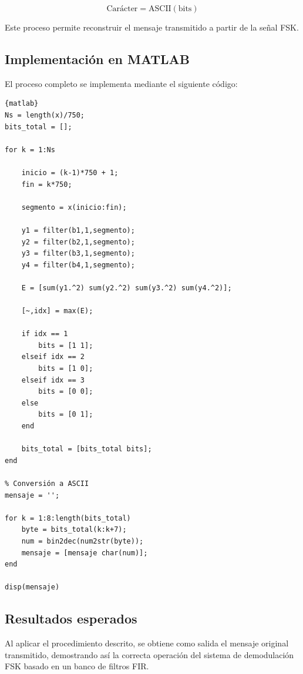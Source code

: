 \documentclass[9pt,a4paper,oneside]{rho-class/rho}
\begin{document}
\begin{equation}
\text{Carácter} = \text{ASCII}(\text{bits})
\end{equation}

Este proceso permite reconstruir el mensaje transmitido a partir de la
señal FSK.

\subsection{Implementación en MATLAB}

El proceso completo se implementa mediante el siguiente código:

\begin{verbatim}{matlab}
Ns = length(x)/750;
bits_total = [];

for k = 1:Ns
    
    inicio = (k-1)*750 + 1;
    fin = k*750;

    segmento = x(inicio:fin);

    y1 = filter(b1,1,segmento);
    y2 = filter(b2,1,segmento);
    y3 = filter(b3,1,segmento);
    y4 = filter(b4,1,segmento);

    E = [sum(y1.^2) sum(y2.^2) sum(y3.^2) sum(y4.^2)];

    [~,idx] = max(E);

    if idx == 1
        bits = [1 1];
    elseif idx == 2
        bits = [1 0];
    elseif idx == 3
        bits = [0 0];
    else
        bits = [0 1];
    end

    bits_total = [bits_total bits];
end

% Conversión a ASCII
mensaje = '';

for k = 1:8:length(bits_total)
    byte = bits_total(k:k+7);
    num = bin2dec(num2str(byte));
    mensaje = [mensaje char(num)];
end

disp(mensaje)
\end{verbatim}

\subsection{Resultados esperados}

Al aplicar el procedimiento descrito, se obtiene como salida el mensaje
original transmitido, demostrando así la correcta operación del sistema de
demodulación FSK basado en un banco de filtros FIR.
\end{document}
